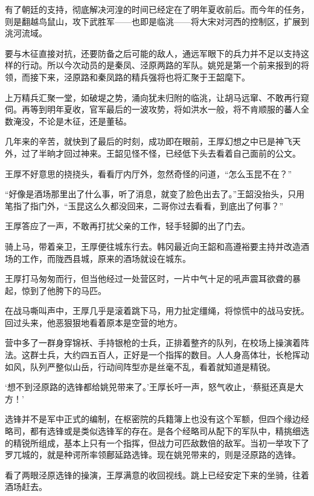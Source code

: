 有了朝廷的支持，彻底解决河湟的时间已经定在了明年夏收前后。而今年的任务，则是翻越鸟鼠山，攻下武胜军——也即是临洮——将大宋对河西的控制区，扩展到洮河流域。

要与木征直接对抗，还要防备之后可能的敌人，通远军眼下的兵力并不足以支持这样的行动。所以今次动员的是秦凤、泾原两路的军队。姚兕是第一个前来报到的将领，而接下来，泾原路和秦凤路的精兵强将也将汇聚于王韶麾下。

上万精兵汇聚一堂，如破堤之势，涌向犹未归附的临洮，让胡马远窜、不敢再行窥伺。再等到明年夏收，官军最后的一波攻势，将如洪水一般，将不肯顺服的蕃人全数淹没，不论是木征，还是董毡。

几年来的辛苦，就快到了最后的时刻，成功即在眼前，王厚幻想之中已是神飞天外，过了半晌才回过神来。王韶见怪不怪，已经低下头去看着自己面前的公文。

王厚不好意思的挠挠头，看看厅内厅外，忽然奇怪的问道，“怎么玉昆不在？”

“好像是酒场那里出了什么事，听了消息，就变了脸色出去了。”王韶没抬头，只用笔指了指门外，“玉昆这么久都没回来，二哥你过去看看，到底出了何事？”

王厚答应了一声，不敢再打扰父亲的工作，轻手轻脚的出了门去。

骑上马，带着亲卫，王厚便往城东行去。韩冈最近向王韶和高遵裕要主持并改造酒场的工作，而陇西县城，原来的酒场就设在城东。

王厚打马匆匆而行，但当他经过一处营区时，一片中气十足的吼声震耳欲聋的暴起，惊到了他胯下的马匹。

在战马嘶叫声中，王厚几乎是滚着跳下马，用力扯定缰绳，将惊慌中的战马安抚。回过头来，他恶狠狠地看着原本是空营的地方。

营中多了一群身穿锦袄、手持银枪的士兵，正排着整齐的队列，在校场上操演着阵法。这群士兵，大约四五百人，正好是一个指挥的数目。人人身高体壮，长枪挥动如风，队列严整似山岳，行动间阵型亦是丝毫不乱，看着就知道是精锐。

‘想不到泾原路的选锋都给姚兕带来了。’王厚长吁一声，怒气收止，‘蔡挺还真是大方！’

选锋并不是军中正式的编制，在枢密院的兵籍簿上也没有这个军额，但四个缘边经略司，都有选锋或是类似选锋军的存在。是各个经略司从配下的军队中，精挑细选的精锐所组成，基本上只有一个指挥，但战力可匹敌数倍的敌军。当初一举攻下了罗兀城的，就是种谔所率领鄜延路选锋。现在姚兕带来的，则是泾原路的选锋。

看了两眼泾原选锋的操演，王厚满意的收回视线。跳上已经安定下来的坐骑，往着酒场赶去。

